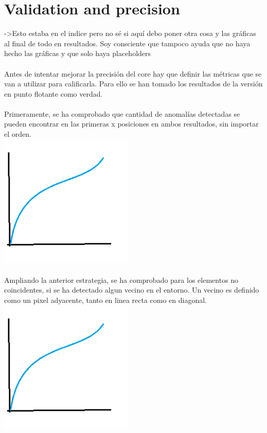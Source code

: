 \section{Validation and precision}
->Esto estaba en el indice pero no sé si aquí debo poner otra cosa y las gráficas al final de todo en resultados. Soy consciente que tampoco ayuda que no haya hecho las gráficas y que solo haya placeholders
\\
\\
Antes de intentar mejorar la precisión del core hay que definir las métricas que se van a utilizar para calificarla.
Para ello se han tomado los resultados de la versión en punto flotante como verdad.
\\
\\
Primeramente, se ha comprobado que cantidad de anomalías detectadas se pueden encontrar en las primeras x posiciones en ambos resultados, sin importar el orden.
\\
\includegraphics[height=2.5in]{figures/precision.png}
\\
\\
Ampliando la anterior estrategia, se ha comprobado para los elementos no coincidentes, si se ha detectado algun vecino en el entorno. Un vecino es definido como un pixel adyacente, tanto en linea recta como en diagonal.
\\
\includegraphics[height=2.5in]{figures/precision.png}
